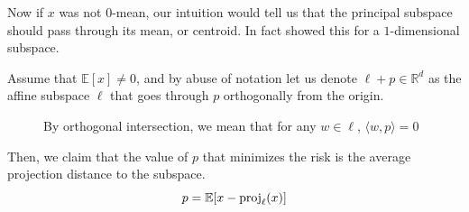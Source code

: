   Now if $x$ was not $0$-mean, our intuition would tell us that the principal subspace should pass through its mean, or centroid. In fact \cite{1901pearson} showed this for a $1$-dimensional subspace. 

  \begin{lemma}
    Assume that $\mathbb{E}[x] \neq 0$, and by abuse of notation let us denote $\ell + p \in \mathbb{R}^d$ as the affine subspace $\ell$ that goes through $p$ orthogonally from the origin. 

    \begin{figure}[H]
      \centering 
      \caption{By orthogonal intersection, we mean that for any $w \in \ell$, $\langle w, p \rangle = 0$} 
    \end{figure}

    Then, we claim that the value of $p$ that minimizes the risk is the average projection distance to the subspace. 
    \begin{equation}
      p = \mathbb{E}[x - \operatorname{proj}_\ell (x)]
    \end{equation}
  \end{lemma}
